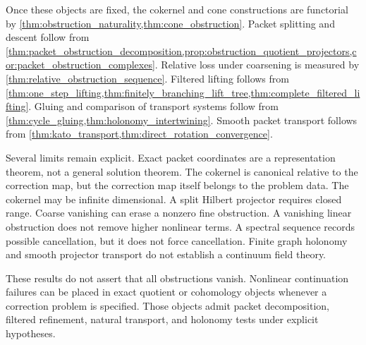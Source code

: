 \documentclass[11pt,a4paper]{article}
\theoremstyle{plain}
\theoremstyle{definition}
\theoremstyle{remark}
\begin{document}
Once these objects are fixed, the cokernel and cone constructions are functorial by \cref{thm:obstruction_naturality,thm:cone_obstruction}.  Packet splitting and descent follow from \cref{thm:packet_obstruction_decomposition,prop:obstruction_quotient_projectors,cor:packet_obstruction_complexes}.  Relative loss under coarsening is measured by \cref{thm:relative_obstruction_sequence}.  Filtered lifting follows from \cref{thm:one_step_lifting,thm:finitely_branching_lift_tree,thm:complete_filtered_lifting}.  Gluing and comparison of transport systems follow from \cref{thm:cycle_gluing,thm:holonomy_intertwining}.  Smooth packet transport follows from \cref{thm:kato_transport,thm:direct_rotation_convergence}.

Several limits remain explicit.  Exact packet coordinates are a representation theorem, not a general solution theorem.  The cokernel is canonical relative to the correction map, but the correction map itself belongs to the problem data.  The cokernel may be infinite dimensional.  A split Hilbert projector requires closed range.  Coarse vanishing can erase a nonzero fine obstruction.  A vanishing linear obstruction does not remove higher nonlinear terms.  A spectral sequence records possible cancellation, but it does not force cancellation.  Finite graph holonomy and smooth projector transport do not establish a continuum field theory.

These results do not assert that all obstructions vanish.  Nonlinear continuation failures can be placed in exact quotient or cohomology objects whenever a correction problem is specified.  Those objects admit packet decomposition, filtered refinement, natural transport, and holonomy tests under explicit hypotheses.



\begingroup\small{}


\endgroup
\end{document}
